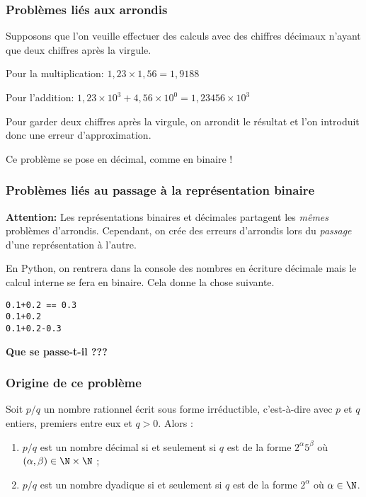 \subsubsection{Problèmes liés aux arrondis}
Supposons que l'on veuille effectuer des calculs avec des chiffres décimaux n'ayant que deux chiffres après la virgule.
\begin{exemple}
Pour la multiplication:
$1,23\times 1,56 = 1,9188$
\end{exemple}
\begin{exemple}
Pour l'addition:
$1,23\times 10^{3} + 4,56\times 10^{0} = 1,23456\times 10^{3}$
\end{exemple}
Pour garder deux chiffres après la virgule, on arrondit le résultat et l'on introduit donc une erreur d'approximation.

Ce problème se pose en décimal, comme en binaire !

\subsubsection{Problèmes liés au passage à la représentation binaire}

\textbf{Attention:}
Les représentations binaires et décimales partagent les \emph{mêmes} problèmes d'arrondis. 
Cependant, on crée des erreurs d'arrondis lors du \emph{passage} d'une représentation à l'autre.
\begin{exemple}
En Python, on rentrera dans la console des nombres en écriture décimale mais le calcul interne se fera en binaire. Cela donne la chose suivante.
\begin{lstlisting}
0.1+0.2 == 0.3
0.1+0.2
0.1+0.2-0.3
\end{lstlisting}
\end{exemple}


\begin{center}
\textbf{Que se passe-t-il ???}
\end{center}

\subsubsection{Origine de ce problème}

\begin{theoremeT}
Soit $p/q$ un nombre rationnel écrit sous forme irréductible, c'est-à-dire avec $p$
et $q$ entiers, premiers entre eux et $q>0$. Alors :
\begin{enumerate}
\item $p/q$ est un nombre décimal si et seulement
  si $q$ est de la forme $2^{\alpha}5^{\beta}$ où $(\alpha,\beta)\in
  \N\times \N$ ;
\item $p/q$ est un nombre dyadique si et seulement
  si $q$ est de la forme $2^{\alpha}$ où $\alpha\in \N$.
\end{enumerate}
\end{theoremeT}

